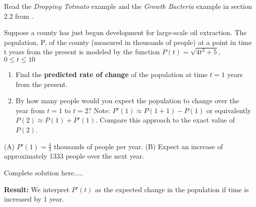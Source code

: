 \noindent Read the \emph{Dropping Totmato} example and the \emph{Growth Bacteria} example in section 2.2 from \cite{Calaway}.
\begin{example}
Suppose a county has just begun development for large-scale oil extraction.  The population, P, of the county (measured in thousands of people) at a point in time t years from the present is modeled by the function $P(t)=\sqrt{4t^2+5}$, $0\le t \le 10$
\renewcommand{\labelenumi}{(\Alph{enumi})}
\begin{enumerate}[leftmargin=*]
    \item Find the \textbf{predicted rate of change} of the population at time $t=1$ years from the present. 
     \vspace{0.5in}
    \item By how many people would you expect the population to change over the year from $t=1$ to $t=2$?  Note:  $P'(1)\approx P(1+1)-P(1)$ or equivalently $P(2)\approx P(1)+P'(1)$.  Compare this approach to the exact value of $P(2)$. 	\vspace{0.5in}		             
\end{enumerate}

    \begin{sol}
    (A) $P'(1)=\frac{4}{3}$ thousands of people per year.  (B) 	Expect an increase of approximately 1333 people over the next year.  
    \end{sol}
    \begin{solL}
    Complete solution here.....
    
    \end{solL}
    
\end{example}
\noindent \textbf{Result:} We interpret $P'(t)$ as the expected change in the population if time is increased by 1 year.\\

